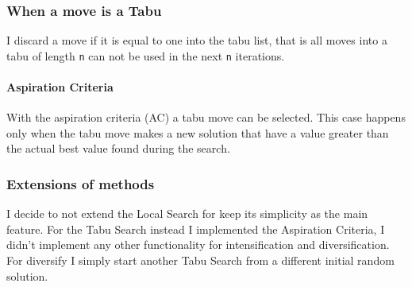 	\subsubsection{When a move is a Tabu}
		I discard a move if it is equal to one into the tabu list, that is all moves into a tabu of length \verb|n| can not be used in the next \verb|n| iterations.
		
		\paragraph{Aspiration Criteria} With the aspiration criteria (AC) a tabu move can be selected. This case happens only when the tabu move makes a new solution that have a value greater than the actual best value found during the search.
		
		
	\subsubsection{Extensions of methods}
		I decide to not extend the Local Search for keep its simplicity as the main feature. For the Tabu Search instead I implemented the Aspiration Criteria, I didn't implement any other functionality for intensification and diversification. For diversify I simply start another Tabu Search from a different initial random solution.
	



	